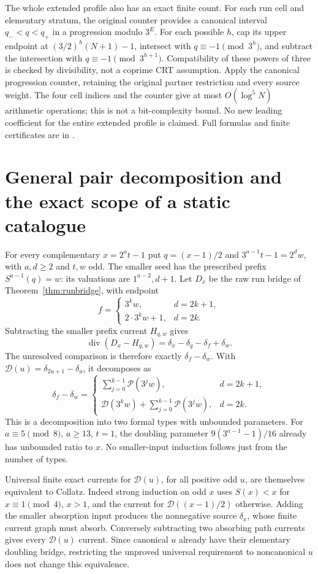 \documentclass[11pt]{article}
\begin{document}
The whole extended profile also has an exact finite count. For each
run cell and elementary stratum, the original counter provides a
canonical interval $q_-<q<q_+$ in a progression modulo $3^E$.
For each possible $h$, cap its upper endpoint at
$(3/2)^h(N+1)-1$, intersect with $q\equiv-1\pmod{3^h}$, and
subtract the intersection with $q\equiv-1\pmod{3^{h+1}}$.
Compatibility of these powers of three is checked by divisibility,
not a coprime CRT assumption. Apply the canonical progression counter,
retaining the original partner restriction and every source weight.
The four cell indices and the counter give at most
$O(\log^5 N)$ arithmetic operations; this is not a bit-complexity bound.
No new leading coefficient for the entire extended profile is claimed.
Full formulas and finite certificates are in
.

\section{General pair decomposition and the exact scope of a static catalogue}
For every complementary $x=2^at-1$ put
$q=(x-1)/2$ and $3^{a-1}t-1=2^dw$, with $a,d\ge2$ and $t,w$ odd.
The smaller seed has the prescribed prefix $S^{a-1}(q)=w$:
its valuations are $1^{a-2},d+1$. Let $D_x$ be the raw run bridge
of Theorem~\ref{thm:runbridge}, with endpoint
\[
f=\begin{cases}3^kw,&d=2k+1,\\2\cdot3^kw+1,&d=2k.\end{cases}
\]
Subtracting the smaller prefix current $H_{q,w}$ gives
\[
\operatorname{div}(D_x-H_{q,w})
=\delta_x-\delta_q-\delta_f+\delta_w.
\]
The unresolved comparison is therefore exactly $\delta_f-\delta_w$.
With $\mathcal D(u)=\delta_{2u+1}-\delta_u$, it decomposes as
\[
\delta_f-\delta_w=
\begin{cases}
\displaystyle\sum_{j=0}^{k-1}\mathcal P(3^jw),&d=2k+1,\\[4pt]
\displaystyle\mathcal D(3^kw)+\sum_{j=0}^{k-1}\mathcal P(3^jw),&d=2k.
\end{cases}
\]
This is a decomposition into two formal types with unbounded parameters.
For $a\equiv5\pmod8$, $a\ge13$, $t=1$, the doubling parameter
$9(3^{a-1}-1)/16$ already has unbounded ratio to $x$.
No smaller-input induction follows just from the number of types.

Universal finite exact currents for $\mathcal D(u)$, for all positive
odd $u$, are themselves equivalent to Collatz. Indeed strong induction
on odd $x$ uses $S(x)<x$ for $x\equiv1\pmod4$, $x>1$, and the
current for $\mathcal D((x-1)/2)$ otherwise. Adding the smaller
absorption input produces the nonnegative source $\delta_x$, whose
finite current graph must absorb. Conversely subtracting two absorbing
path currents gives every $\mathcal D(u)$ current. Since canonical
$u$ already have their elementary doubling bridge, restricting the
unproved universal requirement to noncanonical $u$ does not change
this equivalence.
\end{document}

